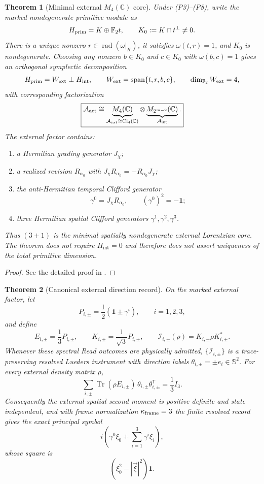 \documentclass[11pt]{article}
\newtheorem{theorem}{Theorem}[section]
\theoremstyle{definition}
\theoremstyle{remark}
\newcommand{\C}{\mathbb C}
\newcommand{\F}{\mathbb F}
\newcommand{\one}{\mathbf 1}
\newcommand{\Tr}{\operatorname{Tr}}
\newcommand{\rad}{\operatorname{rad}}
\newcommand{\Cl}{\mathrm{Cl}}
\newcommand{\A}{\mathcal A}
\newcommand{\ext}{\mathrm{ext}}
\newcommand{\intr}{\mathrm{int}}
\newcommand{\Span}{\operatorname{span}}
\newcommand{\Sphere}{\mathbb S}
\begin{document}
\begin{theorem}[Minimal external $M_4(\C)$ core]
\label{thm:external-core}
Under \textup{(P3)--(P8)}, write the marked
nondegenerate primitive module as
\[
  H_{\rm prim}=K\oplus\F_2t,
  \qquad K_0:=K\cap t^\perp\ne0.
\]
There is a unique nonzero $r\in\rad(\omega|_K)$, it satisfies
$\omega(t,r)=1$, and $K_0$ is nondegenerate.  Choosing any nonzero
$b\in K_0$ and $c\in K_0$ with $\omega(b,c)=1$ gives an orthogonal
symplectic decomposition
\[
  H_{\rm prim}=W_{\ext}\perp H_{\intr},
  \qquad W_{\ext}=\Span\{t,r,b,c\},
  \qquad \dim_{\F_2}W_{\ext}=4,
\]
with corresponding factorization
\[
  \boxed{
  \A_{\rm act}
  \cong
  \underbrace{M_4(\C)}_{\A_{\ext}\cong\Cl_4(\C)}
  \otimes
  \underbrace{M_{2^{m-2}}(\C)}_{\A_{\intr}}.}
\]
The external factor contains:
\begin{enumerate}[label=\textup{(\roman*)},leftmargin=2.7em]
\item a Hermitian grading generator $J_\chi$;
\item a realized revision $R_{\alpha_0}$ with
      $J_\chi R_{\alpha_0}=-R_{\alpha_0}J_\chi$;
\item the anti-Hermitian temporal Clifford generator
      \[
        \gamma^0=J_\chi R_{\alpha_0},
        \qquad (\gamma^0)^2=-\one;
      \]
\item three Hermitian spatial Clifford generators
      $\gamma^1,\gamma^2,\gamma^3$.
\end{enumerate}
Thus $(3+1)$ is the minimal spatially nondegenerate external Lorentzian core.
The theorem does not require $H_{\intr}=0$ and therefore does not assert
uniqueness of the total primitive dimension.
\end{theorem}

\begin{proof}
See the detailed proof in .
\end{proof}

\begin{theorem}[Canonical external direction record]
\label{thm:octahedral-record}
On the marked external factor, let
\[
  P_{i,\pm}=\frac12(\one\pm\gamma^i),
  \qquad i=1,2,3,
\]
and define
\[
  E_{i,\pm}=\frac13P_{i,\pm},
  \qquad K_{i,\pm}=\frac1{\sqrt3}P_{i,\pm},
  \qquad
  \mathcal I_{i,\pm}(\rho)=K_{i,\pm}\rho K_{i,\pm}^*.
\]
Whenever these spectral Read outcomes are physically admitted,
$\{\mathcal I_{i,\pm}\}$ is a trace-preserving resolved Lueders instrument
with direction labels $\theta_{i,\pm}=\pm e_i\in\Sphere^2$.  For every external density matrix $\rho$,
\[
  \sum_{i,\pm}\Tr(\rho E_{i,\pm})\,
       \theta_{i,\pm}\theta_{i,\pm}^{\mathsf T}
  =\frac13 I_3.
\]
Consequently the external spatial second moment is positive definite and
state independent, and with frame normalization $\kappa_{\rm frame}=3$ the
finite resolved record gives the exact principal symbol
\[
  i\left(\gamma^0\xi_0+\sum_{i=1}^3\gamma^i\xi_i\right),
\]
whose square is
\[
  (\xi_0^2-|\vec\xi|^2)\one.
\]
\end{theorem}
\end{document}
